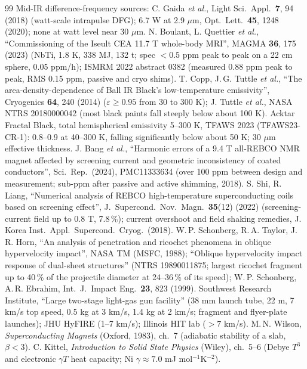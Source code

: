\begin{thebibliography}{99}
 Mid-IR difference-frequency sources: C. Gaida \emph{et al.}, Light Sci.\ Appl.\ \textbf{7}, 94 (2018) (watt-scale intrapulse DFG); 6.7 W at 2.9 $\mu$m, Opt.\ Lett.\ \textbf{45}, 1248 (2020); none at watt level near 30 $\mu$m.
 N. Boulant, L. Quettier \emph{et al.}, ``Commissioning of the Iseult CEA 11.7 T whole-body MRI'', MAGMA \textbf{36}, 175 (2023) (NbTi, 1.8 K, 338 MJ, 132 t; spec $<0.5$ ppm peak to peak on a 22 cm sphere, 0.05 ppm/h); ISMRM 2022 abstract 0382 (measured 0.88 ppm peak to peak, RMS 0.15 ppm, passive and cryo shims).
 T. Copp, J.\,G. Tuttle \emph{et al.}, ``The area-density-dependence of Ball IR Black's low-temperature emissivity'', Cryogenics \textbf{64}, 240 (2014) ($\varepsilon\ge0.95$ from 30 to 300 K); J. Tuttle \emph{et al.}, NASA NTRS 20180000042 (most black paints fall steeply below about 100 K).
 Acktar Fractal Black, total hemispherical emissivity 5--300 K, TFAWS 2023 (TFAWS23-CR-1): 0.8--0.9 at 40--300 K, falling significantly below about 50 K; 30 $\mu$m effective thickness.
 J. Bang \emph{et al.}, ``Harmonic errors of a 9.4 T all-REBCO NMR magnet affected by screening current and geometric inconsistency of coated conductors'', Sci.\ Rep.\ (2024), PMC11333634 (over 100 ppm between design and measurement; sub-ppm after passive and active shimming, 2018).
 S. Shi, R. Liang, ``Numerical analysis of REBCO high-temperature superconducting coils based on screening effect'', J.\ Supercond.\ Nov.\ Magn.\ \textbf{35}(12) (2022) (screening-current field up to 0.8 T, 7.8\,\%); current overshoot and field shaking remedies, J. Korea Inst.\ Appl.\ Supercond.\ Cryog.\ (2018).
 W.\,P. Schonberg, R.\,A. Taylor, J.\,R. Horn, ``An analysis of penetration and ricochet phenomena in oblique hypervelocity impact'', NASA TM (MSFC, 1988); ``Oblique hypervelocity impact response of dual-sheet structures'' (NTRS 19890011875; largest ricochet fragment up to 40\,\% of the projectile diameter at 24--36\,\% of its speed); W.\,P. Schonberg, A.\,R. Ebrahim, Int.\ J.\ Impact Eng.\ \textbf{23}, 823 (1999).
 Southwest Research Institute, ``Large two-stage light-gas gun facility'' (38 mm launch tube, 22 m, 7 km/s top speed, 0.5 kg at 3 km/s, 1.4 kg at 2 km/s; fragment and flyer-plate launches); JHU HyFIRE (1--7 km/s); Illinois HIT lab ($>7$ km/s).
 M.\,N. Wilson, \emph{Superconducting Magnets} (Oxford, 1983), ch.~7 (adiabatic stability of a slab, $\beta<3$).
 C. Kittel, \emph{Introduction to Solid State Physics} (Wiley), ch.~5--6 (Debye $T^3$ and electronic $\gamma T$ heat capacity; Ni $\gamma\approx7.0$ mJ mol$^{-1}$K$^{-2}$).

\end{thebibliography}

